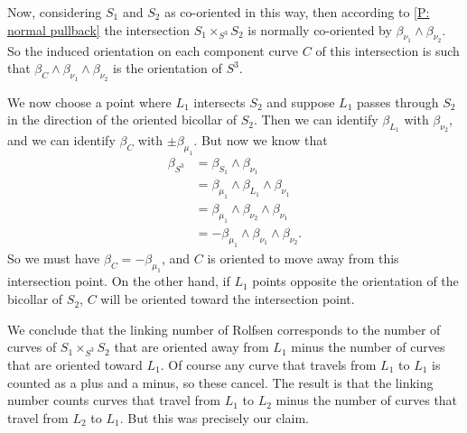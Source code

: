 \begin{comment}
We will also want to know the co-orientation of $L_i$ as the boundary of the co-oriented $S_i$.
By \cref{D: boundary co-orientation} the standard co-orientation of the inclusion $L_i \into S_i$ is $(\beta_{L_i}, \beta_{L_i} \wedge -\beta_{\mu_i})$.
So the boundary co-orientation of $L_i$ into $S^3$ is
\begin{align*}
(\beta_{L_i}, \beta_{L_i} \wedge -\beta_{\mu_i})*(\beta_{S_i},\beta_{S^3}) & =
(\beta_{L_i}, \beta_{\mu_i} \wedge \beta_{L_i})*(\beta_{\mu_i} \wedge \beta_{L_i},\beta_{\mu_i} \wedge \beta_{L_i} \wedge \beta_{\nu_i})\\
&=(\beta_{L_i},\beta_{\mu_i} \wedge \beta_{L_i} \wedge \beta_{\nu_i})\\
&=(\beta_{L_i}, \beta_{L_i} \wedge \beta_{\nu_i} \wedge \beta_{\mu_i}).
\end{align*}
So the normal orientation of $L_i$, co-oriented as $\bd S_i$, is $\beta_{\nu_i} \wedge \beta_{\mu_i}$.
\end{comment}

Now, considering $S_1$ and $S_2$ as co-oriented in this way, then according to \cref{P: normal pullback} the intersection $S_1 \times_{S^3} S_2$ is normally co-oriented by $\beta_{\nu_1} \wedge \beta_{\nu_2}$.
So the induced orientation on each component curve $C$ of this intersection is such that $\beta_C \wedge \beta_{\nu_1} \wedge \beta_{\nu_2}$ is the orientation of $S^3$.


We now choose a point where $L_1$ intersects $S_2$ and suppose $L_1$ passes through $S_2$ in the direction of the oriented bicollar of $S_2$.
Then we can identify $\beta_{L_1}$ with $\beta_{\nu_2}$, and we can identify $\beta_{C}$ with $\pm\beta_{\mu_1}$.
But now we know that
\begin{align*}
	\beta_{S^3} &= \beta_{S_1} \wedge \beta_{\nu_1}\\
				&= \beta_{\mu_1} \wedge \beta_{L_1} \wedge \beta_{\nu_1}\\
				&= \beta_{\mu_1} \wedge \beta_{\nu_2} \wedge \beta_{\nu_1}\\
				&= -\beta_{\mu_1} \wedge \beta_{\nu_1} \wedge  \beta_{\nu_2}.
\end{align*}
So we must have $\beta_C = -\beta_{\mu_1}$, and $C$ is oriented to move away from this intersection point.
On the other hand, if $L_1$ points opposite the orientation of the bicollar of $S_2$, $C$ will be oriented toward the intersection point.

We conclude that the linking number of Rolfsen corresponds to the number of curves of $S_1 \times_{S^3} S_2$ that are oriented away from $L_1$ minus the number of curves that are oriented toward $L_1$.
Of course any curve that travels from $L_1$ to $L_1$ is counted as a plus and a minus, so these cancel.
The result is that the linking number counts curves that travel from $L_1$ to $L_2$ minus the number of curves that travel from $L_2$ to $L_1$.
But this was precisely our claim.

